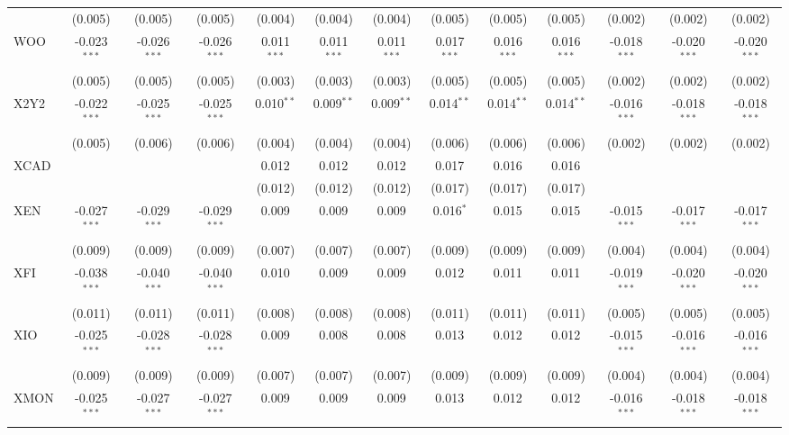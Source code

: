 \begin{table}[!htbp]
\begin{tabular}{@{\extracolsep{5pt}}lcccccccccccc}
  & (0.005) & (0.005) & (0.005) & (0.004) & (0.004) & (0.004) & (0.005) & (0.005) & (0.005) & (0.002) & (0.002) & (0.002) \\
 WOO & -0.023$^{***}$ & -0.026$^{***}$ & -0.026$^{***}$ & 0.011$^{***}$ & 0.011$^{***}$ & 0.011$^{***}$ & 0.017$^{***}$ & 0.016$^{***}$ & 0.016$^{***}$ & -0.018$^{***}$ & -0.020$^{***}$ & -0.020$^{***}$ \\
  & (0.005) & (0.005) & (0.005) & (0.003) & (0.003) & (0.003) & (0.005) & (0.005) & (0.005) & (0.002) & (0.002) & (0.002) \\
 X2Y2 & -0.022$^{***}$ & -0.025$^{***}$ & -0.025$^{***}$ & 0.010$^{**}$ & 0.009$^{**}$ & 0.009$^{**}$ & 0.014$^{**}$ & 0.014$^{**}$ & 0.014$^{**}$ & -0.016$^{***}$ & -0.018$^{***}$ & -0.018$^{***}$ \\
  & (0.005) & (0.006) & (0.006) & (0.004) & (0.004) & (0.004) & (0.006) & (0.006) & (0.006) & (0.002) & (0.002) & (0.002) \\
 XCAD & & & & 0.012$^{}$ & 0.012$^{}$ & 0.012$^{}$ & 0.017$^{}$ & 0.016$^{}$ & 0.016$^{}$ & & & \\
  & & & & (0.012) & (0.012) & (0.012) & (0.017) & (0.017) & (0.017) & & & \\
 XEN & -0.027$^{***}$ & -0.029$^{***}$ & -0.029$^{***}$ & 0.009$^{}$ & 0.009$^{}$ & 0.009$^{}$ & 0.016$^{*}$ & 0.015$^{}$ & 0.015$^{}$ & -0.015$^{***}$ & -0.017$^{***}$ & -0.017$^{***}$ \\
  & (0.009) & (0.009) & (0.009) & (0.007) & (0.007) & (0.007) & (0.009) & (0.009) & (0.009) & (0.004) & (0.004) & (0.004) \\
 XFI & -0.038$^{***}$ & -0.040$^{***}$ & -0.040$^{***}$ & 0.010$^{}$ & 0.009$^{}$ & 0.009$^{}$ & 0.012$^{}$ & 0.011$^{}$ & 0.011$^{}$ & -0.019$^{***}$ & -0.020$^{***}$ & -0.020$^{***}$ \\
  & (0.011) & (0.011) & (0.011) & (0.008) & (0.008) & (0.008) & (0.011) & (0.011) & (0.011) & (0.005) & (0.005) & (0.005) \\
 XIO & -0.025$^{***}$ & -0.028$^{***}$ & -0.028$^{***}$ & 0.009$^{}$ & 0.008$^{}$ & 0.008$^{}$ & 0.013$^{}$ & 0.012$^{}$ & 0.012$^{}$ & -0.015$^{***}$ & -0.016$^{***}$ & -0.016$^{***}$ \\
  & (0.009) & (0.009) & (0.009) & (0.007) & (0.007) & (0.007) & (0.009) & (0.009) & (0.009) & (0.004) & (0.004) & (0.004) \\
 XMON & -0.025$^{***}$ & -0.027$^{***}$ & -0.027$^{***}$ & 0.009$^{}$ & 0.009$^{}$ & 0.009$^{}$ & 0.013$^{}$ & 0.012$^{}$ & 0.012$^{}$ & -0.016$^{***}$ & -0.018$^{***}$ & -0.018$^{***}$ \\

\end{tabular}
\end{table}
